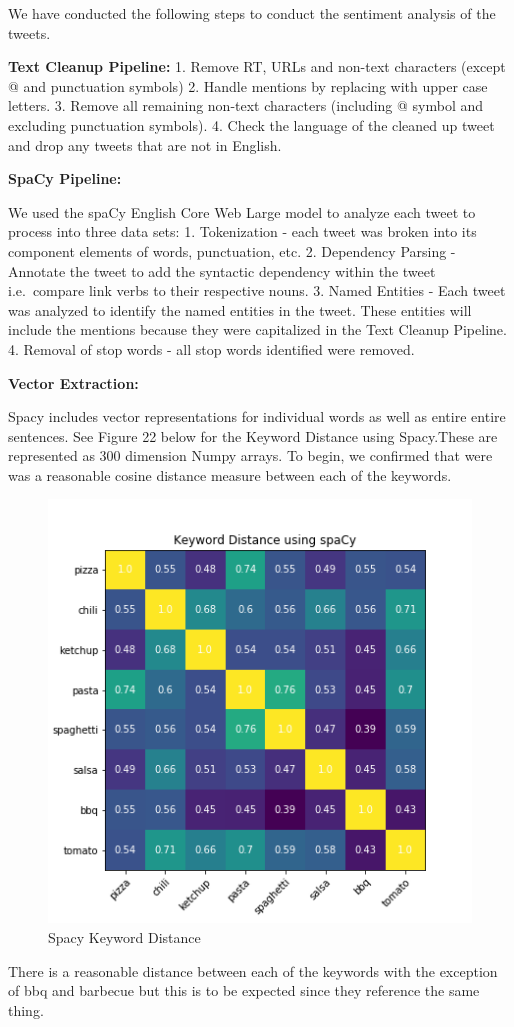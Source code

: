 \documentclass[12pt,oneside]{chicagocapstone}
\begin{document}
We have conducted the following steps to conduct the sentiment analysis
of the tweets.

\textbf{Text Cleanup Pipeline:} 1. Remove RT, URLs and non-text
characters (except @ and punctuation symbols) 2. Handle mentions by
replacing with upper case letters. 3. Remove all remaining non-text
characters (including @ symbol and excluding punctuation symbols). 4.
Check the language of the cleaned up tweet and drop any tweets that are
not in English.

\textbf{SpaCy Pipeline:}

We used the spaCy English Core Web Large model to analyze each tweet to
process into three data sets: 1. Tokenization - each tweet was broken
into its component elements of words, punctuation, etc. 2. Dependency
Parsing - Annotate the tweet to add the syntactic dependency within the
tweet i.e.~compare link verbs to their respective nouns. 3. Named
Entities - Each tweet was analyzed to identify the named entities in the
tweet. These entities will include the mentions because they were
capitalized in the Text Cleanup Pipeline. 4. Removal of stop words - all
stop words identified were removed.

\textbf{Vector Extraction:}

Spacy includes vector representations for individual words as well as
entire entire sentences. See Figure 22 below for the Keyword Distance
using Spacy.These are represented as 300 dimension Numpy arrays. To
begin, we confirmed that were was a reasonable cosine distance measure
between each of the keywords.
\begin{figure}
\centering
\includegraphics{./figure/Keyword_Distance_Spacy.png}
\caption{Spacy Keyword Distance}
\end{figure}
There is a reasonable distance between each of the keywords with the
exception of bbq and barbecue but this is to be expected since they
reference the same thing.
\end{document}
